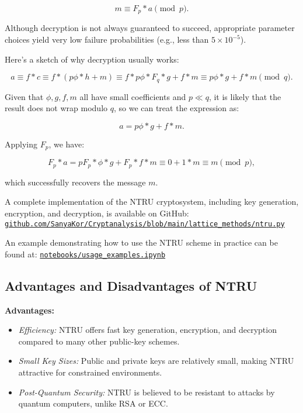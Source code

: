 \documentclass[a4paper,12pt]{article}
\begin{document}
\[
m \equiv F_p * a \pmod{p}.
\]


Although decryption is not always guaranteed to succeed, appropriate parameter choices yield very low failure probabilities (e.g., less than \( 5 \times 10^{-5} \)).

Here’s a sketch of why decryption usually works:

\[
a \equiv f * c \equiv f * (p\phi * h + m) \equiv f * p\phi * F_q * g + f * m \equiv p\phi * g + f * m \pmod{q}.
\]

Given that \( \phi, g, f, m \) all have small coefficients and \( p \ll q \), it is likely that the result does not wrap modulo \( q \), so we can treat the expression as:

\[
a = p\phi * g + f * m.
\]

Applying \( F_p \), we have:

\[
F_p * a = pF_p * \phi * g + F_p * f * m \equiv 0 + 1 * m \equiv m \pmod{p},
\]

which successfully recovers the message \( m \).




\medskip

A complete implementation of the NTRU cryptosystem, including key generation, encryption, and decryption, is available on GitHub:  
\href{https://github.com/SanyaKor/Cryptanalysis/blob/main/lattice\_methods/ntru.py}{\texttt{github.com/SanyaKor/Cryptanalysis/blob/main/lattice\_methods/ntru.py}}

\smallskip

An example demonstrating how to use the NTRU scheme in practice can be found at:  
\href{https://github.com/SanyaKor/Cryptanalysis/blob/main/notebooks/usage_examples.ipynb}{\texttt{notebooks/usage\_examples.ipynb}}

\medskip

\subsection*{Advantages and Disadvantages of NTRU}

\textbf{Advantages:}
\begin{itemize}
  \item \textit{Efficiency:} NTRU offers fast key generation, encryption, and decryption compared to many other public-key schemes.
  \item \textit{Small Key Sizes:} Public and private keys are relatively small, making NTRU attractive for constrained environments.
  \item \textit{Post-Quantum Security:} NTRU is believed to be resistant to attacks by quantum computers, unlike RSA or ECC.
\end{itemize}
\end{document}
